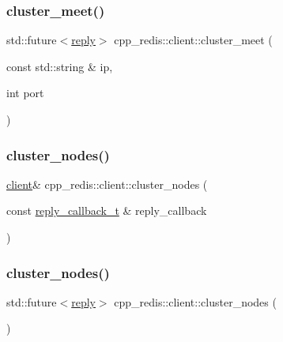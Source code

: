 \subsubsection{\texorpdfstring{cluster\+\_\+meet()}{cluster\_meet()}\hspace{0.1cm}{\footnotesize\ttfamily [2/2]}}
{\footnotesize\ttfamily std\+::future$<$\hyperlink{classcpp__redis_1_1reply}{reply}$>$ cpp\+\_\+redis\+::client\+::cluster\+\_\+meet (\begin{DoxyParamCaption}\item[{const std\+::string \&}]{ip,  }\item[{int}]{port }\end{DoxyParamCaption})}

\mbox{\label{classcpp__redis_1_1client_a1e4cc880ce249fcad1b1f6ddd15f515f}} 
\subsubsection{\texorpdfstring{cluster\+\_\+nodes()}{cluster\_nodes()}\hspace{0.1cm}{\footnotesize\ttfamily [1/2]}}
{\footnotesize\ttfamily \hyperlink{classcpp__redis_1_1client}{client}\& cpp\+\_\+redis\+::client\+::cluster\+\_\+nodes (\begin{DoxyParamCaption}\item[{const \hyperlink{classcpp__redis_1_1client_a061a1140d36d2eaeda82b09a0bb3f9f2}{reply\+\_\+callback\+\_\+t} \&}]{reply\+\_\+callback }\end{DoxyParamCaption})}

\mbox{\label{classcpp__redis_1_1client_a6e777dc7b54ecb4aff3e1c281f92dd81}} 
\subsubsection{\texorpdfstring{cluster\+\_\+nodes()}{cluster\_nodes()}\hspace{0.1cm}{\footnotesize\ttfamily [2/2]}}
{\footnotesize\ttfamily std\+::future$<$\hyperlink{classcpp__redis_1_1reply}{reply}$>$ cpp\+\_\+redis\+::client\+::cluster\+\_\+nodes (\begin{DoxyParamCaption}{ }\end{DoxyParamCaption})}

